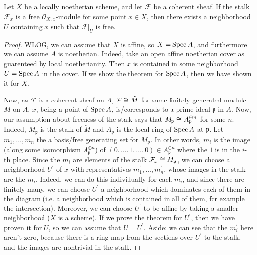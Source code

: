 
\begin{theorem}
	\label{thm:stalk_free_implies_locally_free}

	Let \(X\) be a locally noetherian scheme, and let
	\(\mathcal{F}\) be a coherent sheaf. 
	If the stalk \(\mathcal{F}_{x}\) is a free
	\(\mathcal{O}_{X,x} \)-module for some point
	\(x \in X\), then there exists
	a neighborhood \(U\) containing \(x\) such that
	\(\mathcal{F}|_{U}\) is free.
\end{theorem}

\begin{proof}
	WLOG, we can assume that \(X\) is affine, so 
	\(X = \operatorname{Spec} A\), and furthermore we can assume
	\(A\) is noetherian.
	Indeed, take an open affine noetherian cover 
	as guarenteed by local noetherianity. 
	Then \(x\) is contained in some neighborhood
	\(U = \operatorname{Spec} A\) in the cover. 
	If we show the theorem for \(\operatorname{Spec} A\),
	then we have shown it for \(X\).

	Now, as \(\mathcal{F}\) is a coherent sheaf on 
	\(A\), \(\mathcal{F} \cong \tilde{M}\) for some
	finitely generated module \(M\) on \(A\).
	\(x\), being a point of \(\operatorname{Spec} A\), 
	is/corresponds to a prime
	ideal \(\mathfrak{p}\) in \(A\).
	Now, our assumption about
	freeness of the stalk says that
	\(M_{\mathfrak{p}} \cong A_{\mathfrak{p}}^{\oplus n}\) 
	for some \(n\).
	Indeed, \(M_{\mathfrak{p}}\) is the stalk of 
	\(\tilde{M}\) and \(A_{\mathfrak{p}}\) is the local
	ring of \(\operatorname{Spec} A\) at \(\mathfrak{p}\).
	Let \(m_{1} , \ldots , m_{n}\) the a 
	basis/free generating set for \(M_{\mathfrak{p}}\).
	In other words, \(m_{i}\) is the image 
	(along
	some isomorphism \(A_{\mathfrak{p}}^{\oplus n}\)) of
	\((0, \ldots, 1, \ldots, 0) \in A_{\mathfrak{p}}^{\oplus n}\)
	where the \(1\) is in the \(i\)-th place.
	Since the \(m_{i}\) are elements of the stalk 
	\(\mathcal{F}_{x} \cong M_{\mathfrak{p}}\),
	we can choose a neighborhood \(U^{\prime}\) of \(x\) with 
	representatives \(m_{1}^{\prime}, \ldots, m_{n}^{\prime}\),
	whose images in the stalk are the \(m_{i}\).
	Indeed, we can do this individually for each \(m_{i}\),
	and since there are finitely many, 
	we can choose \(U^{\prime}\) a neighborhood which dominates each of them in 
	the diagram (i.e. a neighborhood which is contained in
	all of them, for example the intersection).
	Moreover, we can choose \(U^{\prime}\) to be affine by taking a 
	smaller neighborhood (\(X\) is a scheme).
	If we prove the theorem for \(U^{\prime}\), then we 
	have proven it for \(U\),
	so we can assume that \(U = U^{\prime}\).
	Aside: we can see that the \(m_{i}^{\prime}\) here aren't
	zero, because there is a ring map from the sections over
	\(U^{\prime}\) to the stalk, and the images are nontrivial in the stalk.



\end{proof}
